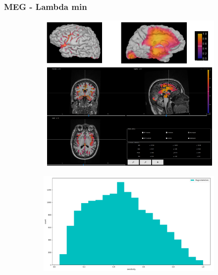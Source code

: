 \documentclass{beamer}
\numberwithin{figure}{section}
\numberwithin{equation}{section}
\begin{document}
\section{}
\begin{frame}
 \frametitle{MEG - Lambda min}
  

 	\begin{figure}[h]
        \begin{subfigure}[h]{0.53\linewidth} 
            \includegraphics[width=\linewidth]{pictures/meg1}
            \label{fig:rdf_graph}
        \end{subfigure}       
        \begin{subfigure}[h]{0.45\linewidth} 
            \includegraphics[width=\linewidth]{pictures/HISTmeg2.png}
            \label{fig:rdfs_graph}
        \end{subfigure}
    \end{figure}

  
\end{frame}
\end{document}
